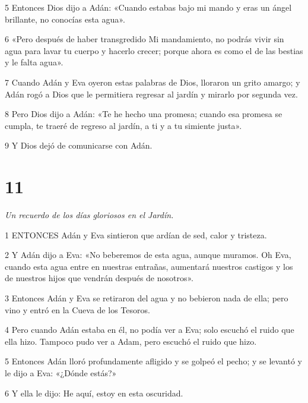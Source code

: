 \par 5 Entonces Dios dijo a Adán: «Cuando estabas bajo mi mando y eras un ángel brillante, no conocías esta agua».

\par 6 «Pero después de haber transgredido Mi mandamiento, no podrás vivir sin agua para lavar tu cuerpo y hacerlo crecer; porque ahora es como el de las bestias y le falta agua».

\par 7 Cuando Adán y Eva oyeron estas palabras de Dios, lloraron un grito amargo; y Adán rogó a Dios que le permitiera regresar al jardín y mirarlo por segunda vez.

\par 8 Pero Dios dijo a Adán: «Te he hecho una promesa; cuando esa promesa se cumpla, te traeré de regreso al jardín, a ti y a tu simiente justa».

\par 9 Y Dios dejó de comunicarse con Adán.

\chapter{11}

\par \textit{Un recuerdo de los días gloriosos en el Jardín.}

\par 1 ENTONCES Adán y Eva sintieron que ardían de sed, calor y tristeza.

\par 2 Y Adán dijo a Eva: «No beberemos de esta agua, aunque muramos. Oh Eva, cuando esta agua entre en nuestras entrañas, aumentará nuestros castigos y los de nuestros hijos que vendrán después de nosotros».

\par 3 Entonces Adán y Eva se retiraron del agua y no bebieron nada de ella; pero vino y entró en la Cueva de los Tesoros.

\par 4 Pero cuando Adán estaba en él, no podía ver a Eva; solo escuchó el ruido que ella hizo. Tampoco pudo ver a Adam, pero escuchó el ruido que hizo.

\par 5 Entonces Adán lloró profundamente afligido y se golpeó el pecho; y se levantó y le dijo a Eva: «¿Dónde estás?»

\par 6 Y ella le dijo: He aquí, estoy en esta oscuridad.

